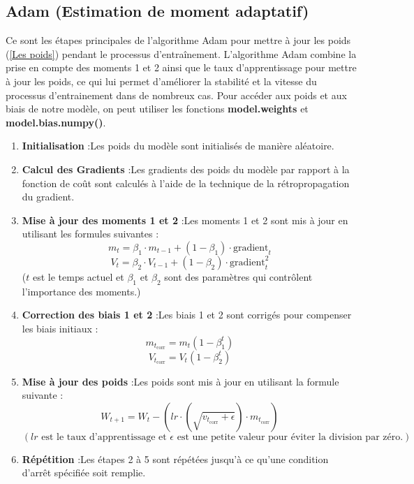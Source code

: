 \subsection{Adam (Estimation de moment adaptatif)}
Ce sont les étapes principales de l'algorithme Adam pour mettre à jour les poids (\ref*{Les poids}) pendant le processus d'entraînement. L'algorithme Adam combine la prise en compte des moments 1 et 2 ainsi que le taux d'apprentissage pour mettre à jour les poids, ce qui lui permet d'améliorer la stabilité et la vitesse du processus d'entrainement dans de nombreux cas. Pour accéder aux poids et aux biais de notre modèle, on peut utiliser les fonctions \textbf{model.weights} et \textbf{model.bias.numpy()}.
\begin{enumerate}
    \item \textbf{Initialisation }:Les poids du modèle sont initialisés de manière aléatoire.
    \item \textbf{Calcul des Gradients }:Les gradients des poids du modèle par rapport à la fonction de coût sont calculés à l'aide de la technique de la rétropropagation du gradient.
    \item \textbf{Mise à jour des moments 1 et 2 }:Les moments 1 et 2 sont mis à jour en utilisant les formules suivantes :
    \[ m_t = \beta_1 \cdot m_{t-1} + (1 - \beta_1) \cdot \text{gradient}_t \]
    \[ V_t = \beta_2 \cdot V_{t-1} + (1 - \beta_2) \cdot \text{gradient}_{t}^{2} \]
    (\(t\) est le temps actuel et \(\beta_1\) et \(\beta_2\) sont des paramètres qui contrôlent l'importance des moments.)
    \item \textbf{Correction des biais 1 et 2 }:Les biais 1 et 2 sont corrigés pour compenser les biais initiaux :
   \[ m_{t_{\text{corr}}} = m_t (1 - \beta_1^t)\]
   \[V_{t_{\text{corr}}} = V_t (1 - \beta_2^t)\]
    \item \textbf{Mise à jour des poids }:Les poids sont mis à jour en utilisant la formule suivante :
    \[W_{t+1} = W_t - \left(lr \cdot \left(\sqrt{v_{t_{\text{corr}}} + \epsilon} \right) \cdot m_{t_{\text{corr}}} \right)\]
\[(lr \text{ est le taux d'apprentissage et } \epsilon \text{ est une petite valeur pour éviter la division par zéro.})\]
    \item \textbf{Répétition }:Les étapes 2 à 5 sont répétées jusqu'à ce qu'une condition d'arrêt spécifiée soit remplie.
\end{enumerate}

